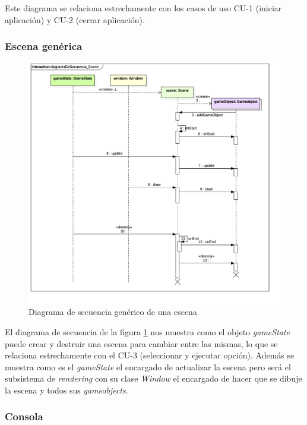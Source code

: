 \bigskip

Este diagrama se relaciona estrechamente con los casos de uso CU-1 (iniciar aplicación) y CU-2 (cerrar aplicación).

\subsubsection*{Escena genérica}

\begin{figure}
	\centerline{\includegraphics[width=15cm]{otros/UML/png/alld/png/CasosDeUso__General__Collaboration2__Interaction1__diagramaDeSecuencia_Scene_16.png}}
	\caption{Diagrama de secuencia genérico de una escena}
	\label{sec:scene}
\end{figure}

El diagrama de secuencia de la figura \ref{sec:scene} nos muestra como el objeto \textit{gameState} puede crear y destruir una escena para cambiar entre las mismas, lo que se relaciona estrechamente con el CU-3 (seleccionar y ejecutar opción). Además se muestra como es el \textit{gameState} el encargado de actualizar la escena pero será el subsistema de \textit{rendering} con su clase \textit{Window} el encargado de hacer que se dibuje la escena y todos sus \textit{gameobjects}.


\subsubsection*{Consola}

